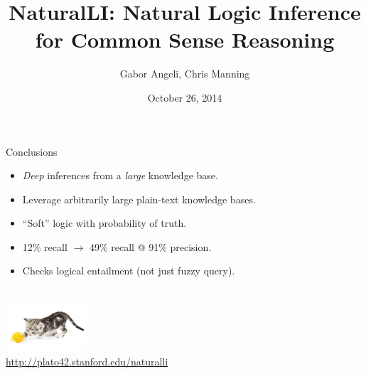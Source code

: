 \documentclass[hyperref]{beamer}
\title{NaturalLI: Natural Logic Inference for Common Sense Reasoning}
\subtitle{}
\author{Gabor Angeli, Chris Manning}
\date{October 26, 2014}
\institute[Stanford]{Stanford University}
\begin{document}
\begin{frame}[noframenumbering]
  \titlepage
\end{frame}




%



\begin{frame}{Conclusions}
\begin{itemize}
  \item \textit{Deep} inferences from a \textit{large} knowledge base.
  \item Leverage arbitrarily large plain-text knowledge bases.
  \item ``Soft'' logic with probability of truth.
\end{itemize}
\vspace{0.5cm}
\pause

\begin{itemize}
  \item 12\% recall $\rightarrow$ 49\% recall @ 91\% precision.
  \item Checks logical entailment (not just fuzzy query).
\end{itemize}
\vspace{0.25cm}
\pause

\end{frame}

\begin{frame}[noframenumbering]{}
\begin{center}
   \\
  \vspace{1cm}
  \includegraphics[width=3cm]{../../img/yarn-cat.jpg} \\
  \vspace{1cm}
  \url{http://plato42.stanford.edu/naturalli}
\end{center}
\end{frame}
\end{document}
